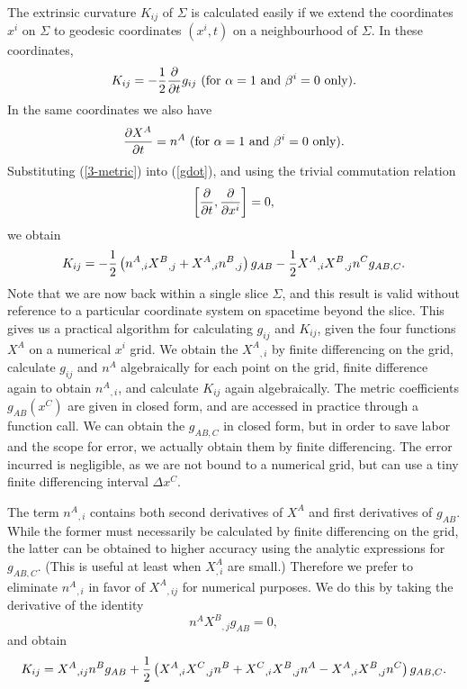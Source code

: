 The extrinsic curvature $K_{ij}$ of $\Sigma$ is calculated easily if
we extend the coordinates $x^i$ on $\Sigma$ to geodesic coordinates
$(x^i,t)$ on a neighbourhood of $\Sigma$. In these coordinates,
\begin{equation}
\label{gdot}
K_{ij} = -{1\over 2}{\partial\over\partial t} g_{ij}  \hbox{ (for } 
\alpha=1 \hbox{ and } \beta^i = 0 \hbox{ only).}
\end{equation}
In the same coordinates we also have 
\begin{equation}
{\partial X^A \over \partial t} = n^A \hbox{ (for } 
\alpha=1 \hbox{ and } \beta^i = 0 \hbox{ only).}
\end{equation}
Substituting (\ref{3-metric}) into (\ref{gdot}), and using the trivial
commutation relation
\begin{equation}
\left[{\partial\over\partial t}, {\partial\over\partial
x^i}\right] = 0, 
\end{equation}
we obtain
\begin{equation}
\label{Kij1}
K_{ij} = -{1\over 2}\left({n^A}_{,i} {X^B}_{,j} + {X^A}_{,i} {n^B}_{,j}\right)
g_{AB}  -{1\over 2}{X^A}_{,i} {X^B}_{,j} n^C g_{AB,C}.
\end{equation}
Note that we are now back within a single slice $\Sigma$, and this
result is valid without reference to a particular coordinate system on
spacetime beyond the slice.  This gives us a practical algorithm for
calculating $g_{ij}$ and $K_{ij}$, given the four functions $X^A$ on a
numerical $x^i$ grid. We obtain the ${X^A}_{,i}$ by finite differencing on
the grid, calculate $g_{ij}$ and $n^A$ algebraically for each point on
the grid, finite difference again to obtain ${n^A}_{,i}$, and
calculate $K_{ij}$ again algebraically. The metric coefficients
$g_{AB}(x^C)$ are given in closed form, and are accessed in practice
through a function call. We can obtain the $g_{AB,C}$ in closed form,
but in order to save labor and the scope for error, we actually obtain
them by finite differencing. The error incurred is negligible, as we
are not bound to a numerical grid, but can use a tiny finite
differencing interval $\Delta x^C$.

The term ${n^A}_{,i}$ contains both second derivatives of $X^A$ and
first derivatives of $g_{AB}$. While the former must necessarily be
calculated by finite differencing on the grid, the latter can be
obtained to higher accuracy using the analytic expressions for
$g_{AB,C}$. (This is useful at least when $X^A_{,i}$ are small.)
Therefore we prefer to eliminate ${n^A}_{,i}$ in favor of
${X^A}_{,ij}$ for numerical purposes. We do this by taking the
derivative of the identity
\begin{equation}
n^A {X^B}_{,j} g_{AB} = 0,
\end{equation}
and obtain
\begin{equation}
\label{Kij2}
K_{ij} =  {X^A}_{,ij} n^B g_{AB}  + {1\over 2} \left(
{X^A}_{,i} {X^C}_{,j} n^B + {X^C}_{,i} {X^B}_{,j} n^A  
- {X^A}_{,i} {X^B}_{,j} n^C 
\right)g_{AB,C}.
\end{equation}

